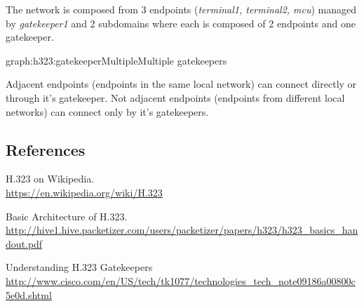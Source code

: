 \documentclass[a4paper]{report}
\begin{document}
The network is composed from 3 endpoints (\emph{terminal1, terminal2, mcu}) managed by \emph{gatekeeper1} and 2 subdomains where each is composed of 2 endpoints and one gatekeeper. 
\begin{Graph}{graph:h323:gatekeeperMultiple}{Multiple gatekeepers}{}
  

     
  

\end{Graph}
Adjacent endpoints (endpoints in the same local network) can connect directly or through it's gatekeeper. Not adjacent endpoints (endpoints from different local networks) can connect only by it's gatekeepers.

\subsection{References}

\renewcommand{\bibsection}{}
\begin{thebibliography}{1}
H.323 on Wikipedia.
\\\url{https://en.wikipedia.org/wiki/H.323}

Basic Architecture of H.323.
\\\url{http://hive1.hive.packetizer.com/users/packetizer/papers/h323/h323_basics_handout.pdf}

Understanding H.323 Gatekeepers
\\\url{http://www.cisco.com/en/US/tech/tk1077/technologies_tech_note09186a00800c5e0d.shtml}
\end{thebibliography}
\end{document}
